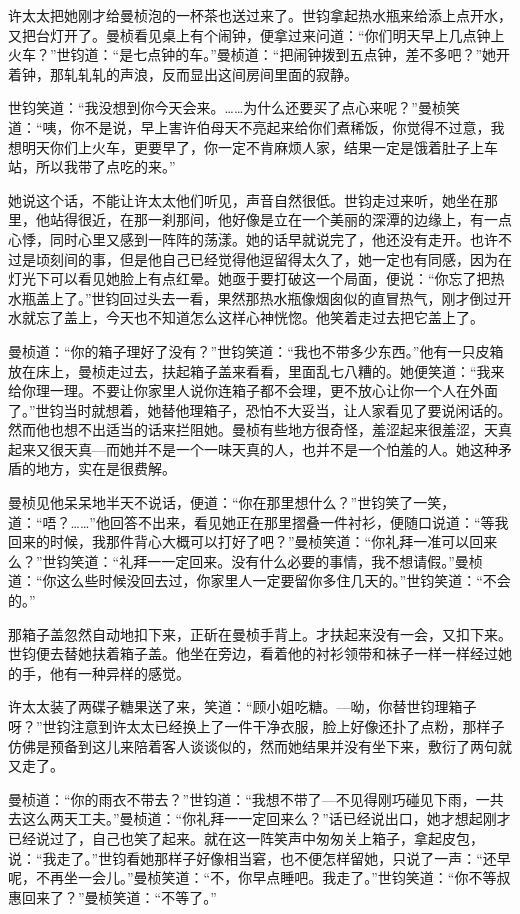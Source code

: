 \par 许太太把她刚才给曼桢泡的一杯茶也送过来了。世钧拿起热水瓶来给添上点开水，又把台灯开了。曼桢看见桌上有个闹钟，便拿过来问道：“你们明天早上几点钟上火车？”世钧道：“是七点钟的车。”曼桢道：“把闹钟拨到五点钟，差不多吧？”她开着钟，那轧轧轧的声浪，反而显出这间房间里面的寂静。
\par 世钧笑道：“我没想到你今天会来。……为什么还要买了点心来呢？”曼桢笑道：“咦，你不是说，早上害许伯母天不亮起来给你们煮稀饭，你觉得不过意，我想明天你们上火车，更要早了，你一定不肯麻烦人家，结果一定是饿着肚子上车站，所以我带了点吃的来。”
\par 她说这个话，不能让许太太他们听见，声音自然很低。世钧走过来听，她坐在那里，他站得很近，在那一刹那间，他好像是立在一个美丽的深潭的边缘上，有一点心悸，同时心里又感到一阵阵的荡漾。她的话早就说完了，他还没有走开。也许不过是顷刻间的事，但是他自己已经觉得他逗留得太久了，她一定也有同感，因为在灯光下可以看见她脸上有点红晕。她亟于要打破这一个局面，便说：“你忘了把热水瓶盖上了。”世钧回过头去一看，果然那热水瓶像烟囱似的直冒热气，刚才倒过开水就忘了盖上，今天也不知道怎么这样心神恍惚。他笑着走过去把它盖上了。
\par 曼桢道：“你的箱子理好了没有？”世钧笑道：“我也不带多少东西。”他有一只皮箱放在床上，曼桢走过去，扶起箱子盖来看看，里面乱七八糟的。她便笑道：“我来给你理一理。不要让你家里人说你连箱子都不会理，更不放心让你一个人在外面了。”世钧当时就想着，她替他理箱子，恐怕不大妥当，让人家看见了要说闲话的。然而他也想不出适当的话来拦阻她。曼桢有些地方很奇怪，羞涩起来很羞涩，天真起来又很天真—而她并不是一个一味天真的人，也并不是一个怕羞的人。她这种矛盾的地方，实在是很费解。
\par 曼桢见他呆呆地半天不说话，便道：“你在那里想什么？”世钧笑了一笑，道：“唔？……”他回答不出来，看见她正在那里摺叠一件衬衫，便随口说道：“等我回来的时候，我那件背心大概可以打好了吧？”曼桢笑道：“你礼拜一准可以回来么？”世钧笑道：“礼拜一一定回来。没有什么必要的事情，我不想请假。”曼桢道：“你这么些时候没回去过，你家里人一定要留你多住几天的。”世钧笑道：“不会的。”
\par 那箱子盖忽然自动地扣下来，正斫在曼桢手背上。才扶起来没有一会，又扣下来。世钧便去替她扶着箱子盖。他坐在旁边，看着他的衬衫领带和袜子一样一样经过她的手，他有一种异样的感觉。
\par 许太太装了两碟子糖果送了来，笑道：“顾小姐吃糖。—呦，你替世钧理箱子呀？”世钧注意到许太太已经换上了一件干净衣服，脸上好像还扑了点粉，那样子仿佛是预备到这儿来陪着客人谈谈似的，然而她结果并没有坐下来，敷衍了两句就又走了。
\par 曼桢道：“你的雨衣不带去？”世钧道：“我想不带了—不见得刚巧碰见下雨，一共去这么两天工夫。”曼桢道：“你礼拜一一定回来么？”话已经说出口，她才想起刚才已经说过了，自己也笑了起来。就在这一阵笑声中匆匆关上箱子，拿起皮包，说：“我走了。”世钧看她那样子好像相当窘，也不便怎样留她，只说了一声：“还早呢，不再坐一会儿。”曼桢笑道：“不，你早点睡吧。我走了。”世钧笑道：“你不等叔惠回来了？”曼桢笑道：“不等了。”
